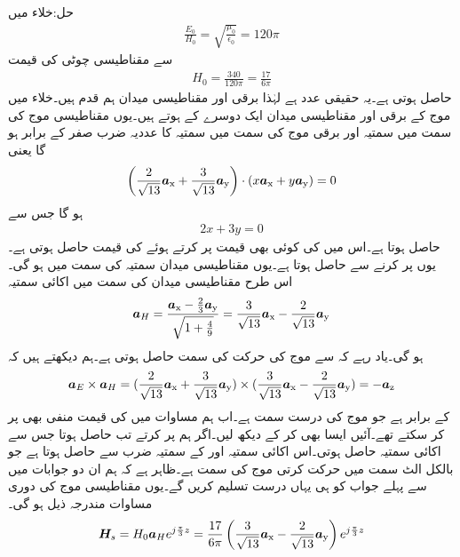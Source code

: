 حل:خلاء میں
\begin{align*}
\frac{E_0}{H_0}=\sqrt{\frac{\mu_0}{\epsilon_0}} =120\pi
\end{align*} 
سے مقناطیسی چوٹی کی قیمت 
\begin{align*}
H_0=\frac{340}{120\pi}=\frac{17}{6\pi}
\end{align*}
حاصل ہوتی ہے۔یہ حقیقی عدد ہے لہٰذا برقی اور مقناطیسی میدان ہم قدم ہیں۔خلاء میں موج کے برقی اور مقناطیسی میدان ایک دوسرے کے   ہوتے ہیں۔یوں مقناطیسی موج کی سمت میں سمتیہ  اور  برقی موج کی سمت میں سمتیہ  کا عددیہ ضرب صفر کے برابر ہو گا یعنی
\begin{align*}
\left(\frac{2}{\sqrt{13}}{\boldsymbol{a}}_{\textup{x}}+\frac{3}{\sqrt{13}}{\boldsymbol{a}}_{\textup{y}}\right) \cdot (x {\boldsymbol{a}}_{\textup{x}}+y {\boldsymbol{a}}_{\textup{y}})=0
\end{align*}
ہو گا جس سے
\begin{align}\label{مساوات_مستوی_موج_برقی_مقناطیسی_عمودی_اکائی}
2x+3y=0
\end{align}
حاصل ہوتا ہے۔اس میں  کی کوئی بھی قیمت پر کرتے ہوئے  کی قیمت حاصل ہوتی ہے۔یوں  پر کرنے سے  حاصل ہوتا ہے۔یوں مقناطیسی میدان   سمتیہ کی سمت میں ہو گی۔ اس طرح مقناطیسی میدان کی سمت میں اکائی سمتیہ
\begin{align*}
{\ensuremath{{\boldsymbol{a}}}}_H=\frac{{\boldsymbol{a}}_{\textup{x}}-\frac{2}{3}{\boldsymbol{a}}_{\textup{y}}}{\sqrt{1+\frac{4}{9}}}=\frac{3}{\sqrt{13}}{\boldsymbol{a}}_{\textup{x}}-\frac{2}{\sqrt{13}}{\boldsymbol{a}}_{\textup{y}}
\end{align*}
ہو گی۔یاد رہے کہ  سے موج کی حرکت کی سمت حاصل ہوتی ہے۔ہم دیکھتے ہیں کہ
\begin{align*}
{\ensuremath{{\boldsymbol{a}}}}_E \times {\ensuremath{{\boldsymbol{a}}}}_H=(\frac{2}{\sqrt{13}}{\boldsymbol{a}}_{\textup{x}}+\frac{3}{\sqrt{13}}{\boldsymbol{a}}_{\textup{y}}) \times (\frac{3}{\sqrt{13}}{\boldsymbol{a}}_{\textup{x}}-\frac{2}{\sqrt{13}}{\boldsymbol{a}}_{\textup{y}})=-{\boldsymbol{a}}_{\textup{z}}
\end{align*}
کے برابر ہے جو موج کی درست سمت ہے۔اب ہم مساوات  میں  کی قیمت منفی بھی پر کر سکتے تھے۔آئیں ایسا بھی کر کے دیکھ لیں۔اگر ہم  پر کرتے تب  حاصل ہوتا جس سے اکائی سمتیہ   حاصل ہوتی۔اس اکائی سمتیہ اور  کے سمتیہ ضرب سے  حاصل ہوتا ہے جو بالکل الٹ سمت میں حرکت کرتی موج کی سمت ہے۔ظاہر ہے کہ ہم ان دو جوابات میں سے پہلے جواب کو ہی یہاں درست تسلیم کریں گے۔یوں مقناطیسی موج کی دوری مساوات مندرجہ ذیل ہو گی۔
\begin{align*}
{\ensuremath{{\boldsymbol{H}}}}_s=H_0 {{\boldsymbol{a}}}_H e^{j\frac{\pi}{3} z}=\frac{17}{6\pi} \left(\frac{3}{\sqrt{13}}{\boldsymbol{a}}_{\textup{x}}-\frac{2}{\sqrt{13}}{\boldsymbol{a}}_{\textup{y}} \right)e^{j\frac{\pi}{3} z}
\end{align*}
 
